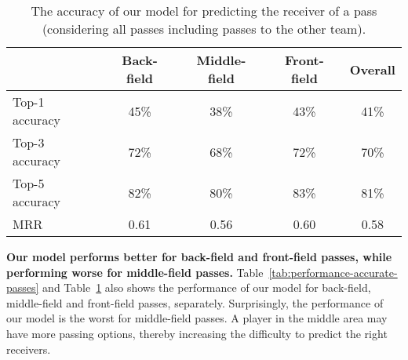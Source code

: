 \begin{table}[!t]
\caption{The accuracy of our model for predicting the receiver of a pass (considering all passes including passes to the other team).}
\centering
\begin{tabular}{lcccc}
  \toprule
  & Back-field & Middle-field & Front-field & Overall \\
  \midrule
  Top-1 accuracy & 45\% & 38\% & 43\% & 41\% \\
  Top-3 accuracy & 72\% & 68\% & 72\% & 70\% \\
  Top-5 accuracy & 82\% & 80\% & 83\% & 81\% \\
  MRR & 0.61 & 0.56 & 0.60 & 0.58 \\
  \bottomrule
\end{tabular}
\label{tab:performance-all-passes}
\end{table}

\textbf{Our model performs better for back-field and front-field passes, while performing worse for middle-field passes.}
Table~\ref{tab:performance-accurate-passes} and Table~\ref{tab:performance-all-passes} also shows the performance of our model for back-field, middle-field and front-field passes, separately.
Surprisingly, the performance of our model is the worst for middle-field passes. A player in the middle area may have more passing options, thereby increasing the difficulty to predict the right receivers.

